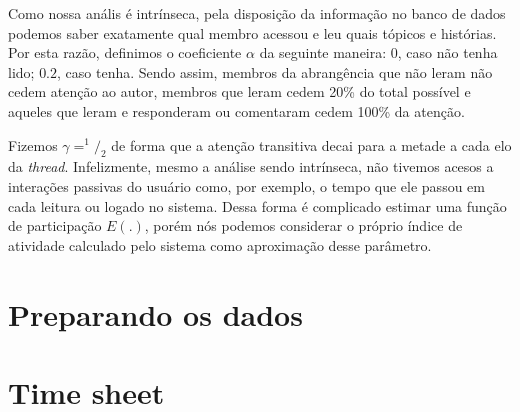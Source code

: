 Como nossa anális é intrínseca, pela disposição da informação no banco de dados
podemos saber exatamente qual membro acessou e leu quais tópicos e histórias.
Por esta razão, definimos o coeficiente $\alpha$ da seguinte maneira: 0, caso
não tenha lido; $0.2$, caso tenha. Sendo assim, membros da abrangência que não
leram não cedem atenção ao autor, membros que leram cedem 20\% do total possível
e aqueles que leram e responderam ou comentaram cedem 100\% da atenção.

Fizemos $\gamma=^1/_2$ de forma que a atenção transitiva decai para a metade a
cada elo da \textit{thread}. Infelizmente, mesmo a análise sendo intrínseca, não
tivemos acesos a interações passivas do usuário como, por exemplo, o tempo que
ele passou em cada leitura ou logado no sistema. Dessa forma é complicado
estimar uma função de participação $E(.)$, porém nós podemos considerar o
próprio índice de atividade calculado pelo sistema como aproximação desse
parâmetro.

\section{Preparando os dados}
\label{ap:sec:preparacao}



\def \tick{
$[$\hspace{0.3cm}$]$
}

\def \twooption#1#2{
\tick #1.  \tick #2.
}

\def \threeoption#1#2#3{
\tick #1.\newline
\tick #2.\newline
\tick #3.
}

\def \fouroption#1#2#3#4{
\tick #1.\newline
\tick #2.\newline
\tick #3.\newline
\tick #4.
}

\def \fiveoption#1#2#3#4#5{
\tick #1.\newline
\tick #2.\newline
\tick #3.\newline
\tick #4.\newline
\tick #5.
}
\def \datefield{
    /\hspace{0.4cm}/
}

\def \rcolor{
    \rowcolor[gray]{0.9}
}

\def \hcolor{
    \rowcolor[gray]{0.7}
}

\section{Time sheet}
\label{ap:sec:time-sheet}

